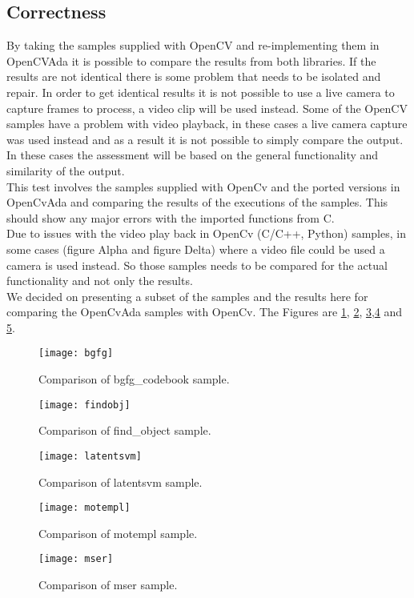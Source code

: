 \subsection{Correctness}
By taking the samples supplied with OpenCV and re-implementing them in OpenCVAda it is possible to compare the results from both libraries. If the results are not identical there is some problem that needs to be isolated and repair. In order to get identical results it is not possible to use a live camera to capture frames to process, a video clip will be used instead. Some of the OpenCV samples have a problem with video playback, in these cases a live camera capture was used instead and as a result it is not possible to simply compare the output. In these cases the assessment will be based on the general functionality and similarity of the output.
\\
This test involves the samples supplied with OpenCv and the ported versions in OpenCvAda and comparing the results of the executions of the samples. This should show any major errors with the imported functions from C.
\\
Due to issues with the video play back in OpenCv (C/C++, Python) samples, in some cases (figure Alpha and figure Delta) where a video file could be used a camera is used instead. So those samples needs to be compared for the actual functionality and not only the results.
\\
We decided on presenting a subset of the samples and the results here for comparing the OpenCvAda samples with OpenCv. The Figures are \ref{fig:bgfg}, \ref{fig:findobj}, \ref{fig:latentsvm},\ref{fig:motempl} and \ref{fig:mser}.
\begin{figure}
\centering
\texttt{[image: bgfg]}
\caption{Comparison of bgfg_codebook sample.}
\label{fig:bgfg}
\end{figure}
\begin{figure}
\centering
\texttt{[image: findobj]}
\caption{Comparison of find_object sample.}
\label{fig:findobj}
\end{figure}
\begin{figure}
\centering
\texttt{[image: latentsvm]}
\caption{Comparison of latentsvm sample.}
\label{fig:latentsvm}
\end{figure}
\begin{figure}
\centering
\texttt{[image: motempl]}
\caption{Comparison of motempl sample.}
\label{fig:motempl}
\end{figure}
\begin{figure}
\centering
\texttt{[image: mser]}
\caption{Comparison of mser sample.}
\label{fig:mser}
\end{figure}

